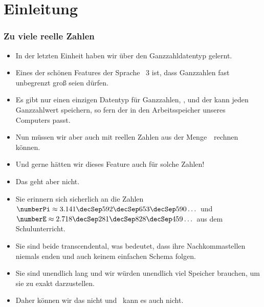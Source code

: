 \documentclass[aspectratio=169,mathserif,notheorems]{beamer}%
\subtitle{8.~Der Datentype float}%
\begin{document}
%
%
\startPresentation%
%
\section{Einleitung}%
\begin{frame}%
\frametitle{Zu viele reelle Zahlen}%
\begin{itemize}%
\item In der letzten Einheit haben wir über den Ganzzahldatentyp  gelernt.%
\item<2-> Eines der schönen Features der Sprache \python~3 ist, dass Ganzzahlen fast unbegrenzt groß seien dürfen.
\item<3-> Es gibt nur einen einzigen Datentyp für Ganzzahlen, , und der kann jeden Ganzzahlwert speichern, so fern der in den Arbeitsspeicher unseres Computers passt.%
\item<4-> Nun müssen wir aber auch mit reellen Zahlen aus der Menge~\realNumbers\ rechnen können.%
\item<5-> Und gerne hätten wir dieses Feature auch für solche Zahlen!%
\item<6-> Das geht aber nicht.%
\item<7-> Sie erinnern sich sicherlich an die Zahlen $\numberPi\approx3.141\decSep592\decSep653\decSep590\dots$ und $\numberE\approx2.718\decSep281\decSep828\decSep459\dots$ aus dem Schulunterricht.%
\item<8-> Sie sind beide transcendental\cite{N1939TTOP,APM1991AAAFI:TOEAP,F2011TTOEAP}, was bedeutet, dass ihre Nachkommastellen niemals enden und auch keinem einfachen Schema folgen.%
\item<9-> Sie sind unendlich lang und wir würden unendlich viel Speicher brauchen, um sie zu exakt darzustellen.%
\item<10-> Daher können wir das nicht und \python\ kann es auch nicht.%
\end{itemize}%
\end{frame}%
%
\end{document}
